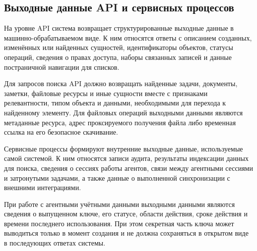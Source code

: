 \textheadingsep
\subsection{Выходные данные API и сервисных процессов}

\headingtextsep

На уровне API система возвращает структурированные выходные данные в машинно-обрабатываемом виде. К ним относятся ответы с описанием созданных, изменённых или найденных сущностей, идентификаторы объектов, статусы операций, сведения о правах доступа, наборы связанных записей и данные постраничной навигации для списков.

Для запросов поиска API должно возвращать найденные задачи, документы, заметки, файловые ресурсы и иные сущности вместе с признаками релевантности, типом объекта и данными, необходимыми для перехода к найденному элементу. Для файловых операций выходными данными являются метаданные ресурса, адрес проксируемого получения файла либо временная ссылка на его безопасное скачивание.

Сервисные процессы формируют внутренние выходные данные, используемые самой системой. К ним относятся записи аудита, результаты индексации данных для поиска, сведения о сессиях работы агентов, связи между агентными сессиями и затронутыми задачами, а также данные о выполненной синхронизации с внешними интеграциями.

При работе с агентными учётными данными выходными данными являются сведения о выпущенном ключе, его статусе, области действия, сроке действия и времени последнего использования. При этом секретная часть ключа может выводиться только в момент создания и не должна сохраняться в открытом виде в последующих ответах системы.